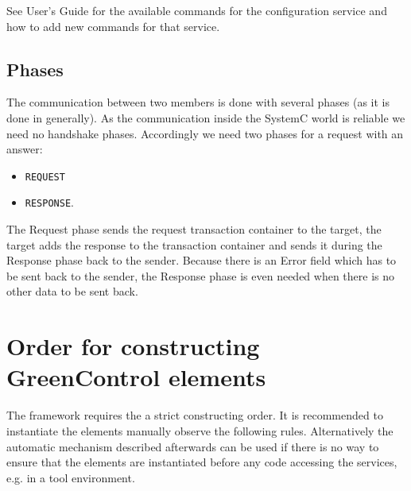 See \GreenConfig User's Guide for the available commands for the configuration service and how to add new commands for that service.


\subsection{Phases}
The communication between two members is done with several phases (as
it is done in \GreenBus generally). As the communication inside the SystemC world is reliable we need no handshake phases. Accordingly we need two phases for a request with an answer: 

\begin{itemize}
\item \lstinline|REQUEST| 
\item \lstinline|RESPONSE|. 
\end{itemize}

The Request phase sends the request transaction container to the
target, the target adds the response to the transaction container and
sends it during the Response phase back to the sender. Because there
is an Error field which has to be sent back to the sender, the
Response phase is even needed when there is no other data to be sent
back.


\section{Order for constructing GreenControl elements}
\label{OrderConstructionElements}
The \GreenControl framework requires the a strict constructing order. It is recommended to instantiate the elements manually observe the following rules. Alternatively the automatic mechanism described afterwards can be used if there is no way to ensure that the \GreenControl elements are instantiated before any code accessing the services, e.g. in a tool environment.

